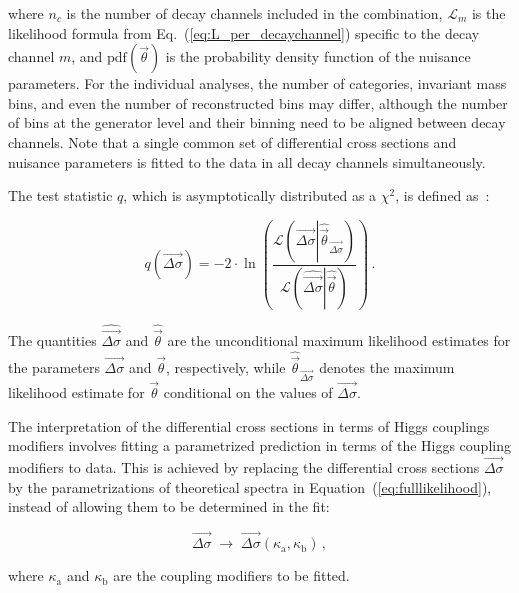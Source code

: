 % 
where $n_c$ is the number of decay channels included in the combination, $\mathcal{L}_m$ is the likelihood formula from Eq.~(\ref{eq:L_per_decaychannel}) specific to the decay channel $m$, and $\text{pdf}(\vec{\theta})$ is the probability density function of the nuisance parameters.
% 
For the individual analyses, the number of categories, invariant mass bins, and even the number of reconstructed bins may differ, although the number of bins at the generator level and their binning need to be aligned between decay channels.
% 
Note that a single common set of differential cross sections and nuisance parameters is fitted to the data in all decay channels simultaneously.


The test statistic $q$, which is asymptotically distributed as a $\chi^2$, is defined as~\cite{Cowan:2010js}:
% 
\begin{linenomath*}
\begin{equation}
q(\vec{\Delta\sigma}) = -2 \cdot \ln \left(
    \frac{
        \mathcal{L}
            \left(
            \vec{\Delta\sigma} \left| \hat{\vec{\theta}}_{\vec{\Delta\sigma}}
            \right)\right.
        }{
        \mathcal{L}
            \left(
            \hat{\vec{\Delta\sigma}} \left| \hat{\vec{\theta}}
            \right)\right.
        }
\right)
\,.
\label{eq:TestStatisticQ}
\end{equation}
\end{linenomath*}
% 
The quantities $\hat{\vec{\Delta\sigma}}$ and $\hat{\vec{\theta}}$ are the unconditional maximum likelihood estimates for the parameters $\vec{\Delta\sigma}$ and $\vec{\theta}$, respectively, while $\hat{\vec{\theta}}_{\vec{\Delta\sigma}}$ denotes the maximum likelihood estimate for $\vec{\theta}$ conditional on the values of $\vec{\Delta\sigma}$.


The interpretation of the differential cross sections in terms of Higgs couplings modifiers involves fitting a parametrized prediction in terms of the Higgs coupling modifiers to data.
% 
This is achieved by replacing the differential cross sections $\vec{\Delta\sigma}$ by the parametrizations of theoretical spectra in Equation~(\ref{eq:fulllikelihood}), instead of allowing them to be determined in the fit:
% 
\begin{linenomath*}
\begin{equation}
    \vec{\Delta\sigma} \; \to \; \vec{\Delta\sigma}( \kappa_\text{a}, \kappa_\text{b} )
    \,,
\end{equation}
\end{linenomath*}
% 
where $\kappa_\text{a}$ and $\kappa_\text{b}$ are the coupling modifiers to be fitted.


